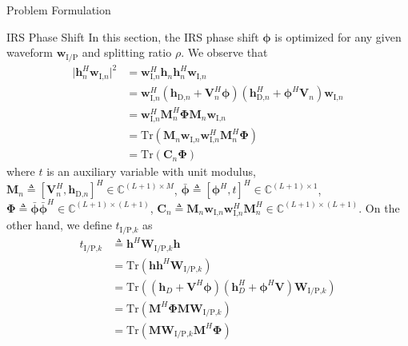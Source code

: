 \documentclass[journal]{IEEEtran}
\begin{document}
\begin{section}{Problem Formulation}
		\begin{subsection}{IRS Phase Shift}
			In this section, the IRS phase shift $\boldsymbol{\phi}$ is optimized for any given waveform $\boldsymbol{w}_{\text{I/P}}$ and splitting ratio $\rho$. We observe that
			\begin{align}
				\lvert \boldsymbol{h}_{n}^H\boldsymbol{w}_{\text{I,}n} \rvert^2
				& = \boldsymbol{w}_{\text{I,}n}^H\boldsymbol{h}_n\boldsymbol{h}_n^H\boldsymbol{w}_{\text{I,}n}\nonumber\\
				& = \boldsymbol{w}_{\text{I,}n}^H(\boldsymbol{h}_{\text{D,}n}+\boldsymbol{V}_n^H\boldsymbol{\phi})(\boldsymbol{h}_{\text{D,}n}^H+\boldsymbol{\phi}^H\boldsymbol{V}_n)\boldsymbol{w}_{\text{I,}n}\nonumber\\
				& = \boldsymbol{w}_{\text{I,}n}^H\boldsymbol{M}_n^H\boldsymbol{\Phi}\boldsymbol{M}_n\boldsymbol{w}_{\text{I,}n}\nonumber\\
				& = \mathrm{Tr}(\boldsymbol{M}_n\boldsymbol{w}_{\text{I,}n}\boldsymbol{w}_{\text{I,}n}^H\boldsymbol{M}_n^H\boldsymbol{\Phi})\nonumber\\
				& = \mathrm{Tr}(\boldsymbol{C}_n\boldsymbol{\Phi})
			\end{align}
			where $t$ is an auxiliary variable with unit modulus, $\boldsymbol{M}_n \triangleq [\boldsymbol{V}_n^H, \boldsymbol{h}_{\text{D,}n}]^H \in \mathbb{C}^{(L+1) \times M}$, $\bar{\boldsymbol{\phi}} \triangleq [\boldsymbol{\phi}^H, t]^H \in \mathbb{C}^{(L+1) \times 1}$, $\boldsymbol{\Phi} \triangleq \bar{\boldsymbol{\phi}}\bar{\boldsymbol{\phi}}^H \in \mathbb{C}^{(L+1) \times (L+1)}$, $\boldsymbol{C}_n \triangleq \boldsymbol{M}_n\boldsymbol{w}_{\text{I,}n}\boldsymbol{w}_{\text{I,}n}^H\boldsymbol{M}_n^H \in \mathbb{C}^{(L+1)\times(L+1)}$. On the other hand, we define $t_{\text{I/P,}k}$ as
			\begin{align}
				t_{\text{I/P,}k}
				& \triangleq \boldsymbol{h}^H\boldsymbol{W}_{\text{I/P,}k}\boldsymbol{h}\nonumber\\
				& = \mathrm{Tr}(\boldsymbol{h}\boldsymbol{h}^H\boldsymbol{W}_{\text{I/P,}k})\nonumber\\
				& = \mathrm{Tr}\left((\boldsymbol{h}_{D}+\boldsymbol{V}^H\boldsymbol{\phi})(\boldsymbol{h}_{D}^H+\boldsymbol{\phi}^H\boldsymbol{V})\boldsymbol{W}_{\text{I/P,}k}\right)\nonumber\\
				& = \mathrm{Tr}(\boldsymbol{M}^H\boldsymbol{\Phi}\boldsymbol{M}\boldsymbol{W}_{\text{I/P,}k})\nonumber\\
				& = \mathrm{Tr}(\boldsymbol{M}\boldsymbol{W}_{\text{I/P,}k}\boldsymbol{M}^H\boldsymbol{\Phi})\nonumber\\

\end{align}
\end{subsection}
\end{section}
\end{document}
